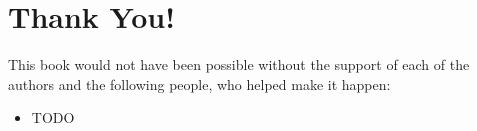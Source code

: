\section*{Thank You!}

This book would not have been possible without the support of each of the
authors and the following people, who helped make it happen:
\begin{itemize}
 \item TODO
\end{itemize}

\newpage
